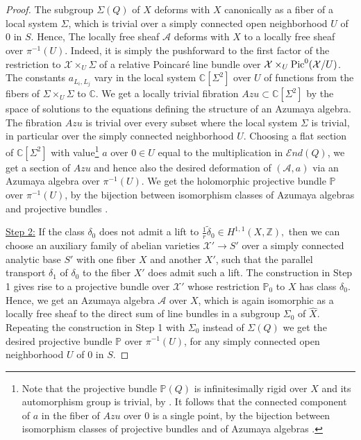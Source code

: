 \documentclass[12pt]{amsart}
\numberwithin{equation}{subsection}
\theoremstyle{plain}
\theoremstyle{definition}
\newcommand{\A}{{\mathcal A}}
\newcommand{\CC}{{\mathbb C}}
\newcommand{\X}{{\mathcal X}}
\newcommand{\ZZ}{{\mathbb Z}}
\newcommand{\PP}{{\mathbb P}}
\newcommand{\Pic}{{\rm Pic}}
\newcommand{\SheafEnd}{{\mathcal E}nd}
\begin{document}
\begin{proof}
The subgroup $\Sigma(Q)$ of $\hat{X}$ deforms with $X$ canonically as a fiber of a local system $\Sigma$, which is trivial 
over a simply connected open neighborhood $U$ of $0$ in $S$. Hence, 
The locally free sheaf $\A$ deforms with $X$ to a locally free sheaf over $\pi^{-1}(U)$. 
Indeed, it is simply the pushforward to the first factor of the restriction to $\X\times_U\Sigma$  of a relative Poincar\'{e} line bundle over $\X\times_U \Pic^0(\X/U)$.
The constants $a_{L_i,L_j}$ vary in the local system $\CC[\Sigma^2]$
over $U$ of functions from the fibers of $\Sigma\times_U\Sigma$ to $\CC$.
We get a locally trivial fibration $Azu\subset \CC[\Sigma^2]$ by the space of solutions to the equations defining the structure of an Azumaya algebra. The fibration  $Azu$ is trivial over every subset where the local system $\Sigma$ is trivial, in particular over the simply connected neighborhood $U$.
Choosing a flat section of $\CC[\Sigma^2]$ with value\footnote{Note that the projective bundle $\PP(Q)$ is infinitesimally rigid over $X$ and its automorphism group is trivial, by \cite[Proposition 5.9 and Lemma 6.7]{mukai-semihomogeneous}. It follows that the connected component of $a$ in the fiber of $Azu$ over $0$ is a single point, by the bijection between isomorphism classes of projective bundles and of Azumaya algebras \cite[Proposition IV.2.3]{milne}.} 
$a$ over $0\in U$ equal to the multiplication in $\SheafEnd(Q)$, we get a section of $Azu$  and hence also the desired deformation of $(\A,a)$ via an Azumaya algebra over $\pi^{-1}(U)$. We get the holomorphic projective bundle $\PP$ over $\pi^{-1}(U)$, by the bijection between isomorphism classes of Azumaya algebras and projective bundles \cite[Proposition IV.2.3]{milne}.

\underline{Step 2:}
If the class $\delta_0$ does not admit a lift to $\frac{1}{r}\tilde{\delta}_0\in H^{1,1}(X,\ZZ),$ then we can choose an auxiliary family of abelian varieties $\X'\rightarrow S'$ over a simply connected analytic base $S'$ with one fiber $X$ and another $X'$, such that the parallel transport $\delta_1$ of $\delta_0$ to the fiber $X'$ does admit such a lift. The construction in Step 1 gives rise to a projective bundle over $\X'$ whose restriction $\PP_0$ to $X$ has class $\delta_0$. Hence, we get an Azumaya algebra $\A$ over $X$, which is again isomorphic as a locally free sheaf to the direct sum of line bundles in a subgroup $\Sigma_0$ of $\hat{X}$. Repeating the construction in Step 1 with $\Sigma_0$ instead of $\Sigma(Q)$ we get  the desired projective bundle $\PP$ over $\pi^{-1}(U)$, for any simply connected open neighborhood $U$ of $0$ in $S$.
\end{proof}
\end{document}

